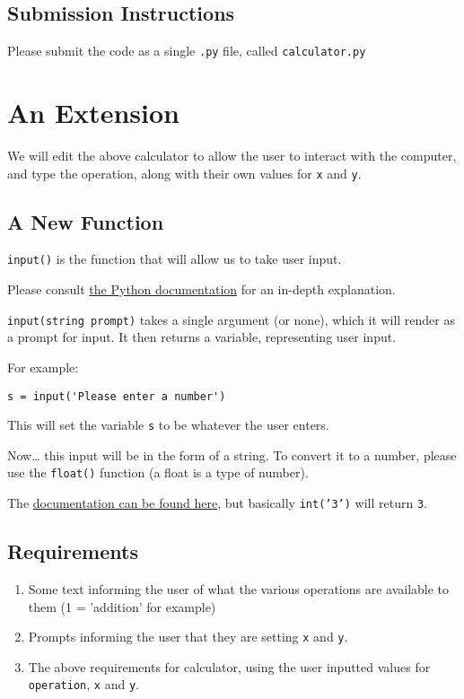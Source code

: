 \documentclass[11pt]{article}
\begin{document}
\subsection{Submission Instructions}
\label{sec:orgbcf23a8}
Please submit the code as a single \texttt{.py} file, called \texttt{calculator.py}
\section{An Extension}
\label{sec:org1c5fddc}
We will edit the above calculator to allow the user to interact with the computer, and type the operation, along with their own values for \texttt{x} and \texttt{y}.
\subsection{A New Function}
\label{sec:org9b9ac27}
\texttt{input()} is the function that will allow us to take user input.

Please consult \href{https://docs.python.org/3/library/functions.html\#input}{the Python documentation} for an in-depth explanation.

\texttt{input(string prompt)} takes a single argument (or none), which it will render as a prompt for input.  It then returns a variable, representing user input.

For example:
\begin{verbatim}
s = input('Please enter a number')
\end{verbatim}

This will set the variable \texttt{s} to be whatever the user enters.

Now\ldots{} this input will be in the form of a string.  To convert it to a number, please use the \texttt{float()} function (a float is a type of number).

The \href{https://docs.python.org/3/library/functions.html\#int}{documentation can be found here}, but basically \texttt{int('3')} will return \texttt{3}.
\subsection{Requirements}
\label{sec:orgaefca50}
\begin{enumerate}
\item Some text informing the user of what the various operations are available to them (1 = 'addition' for example)
\item Prompts informing the user that they are setting \texttt{x} and \texttt{y}.
\item The above requirements for calculator, using the user inputted values for \texttt{operation}, \texttt{x} and \texttt{y}.
\end{enumerate}
\end{document}

